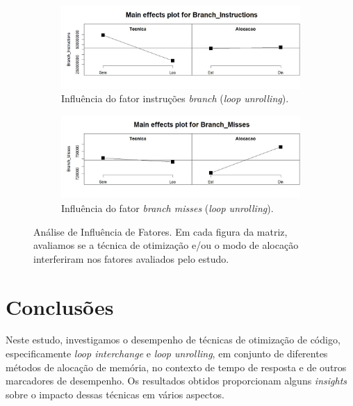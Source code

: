 \documentclass[12pt,a4paper]{article}
\begin{document}
\begin{figure}[H]
\begin{subfigure}{0.49\linewidth}
    \includegraphics[width=\linewidth]{Figures/fig_fatores_instrucoes_branch.jpg}
    \caption{Influência do fator instruções \textit{branch} (\textit{loop unrolling}).}
    \label{sub_fig:instrucoes_branch}
\end{subfigure}
\hfill
\begin{subfigure}{0.49\linewidth}
    \includegraphics[width=\linewidth]{Figures/fig_fatores_branch_misses.jpg}
    \caption{Influência do fator \textit{branch misses} (\textit{loop unrolling}).}
    \label{sub_fig:branch_misses}
\end{subfigure}

\caption{Análise de Influência de Fatores. Em cada figura da matriz, avaliamos se a técnica de otimização e/ou o modo de alocação interferiram nos fatores avaliados pelo estudo.}
\label{fig:influencia_fatores}
\end{figure}

\section{Conclusões} \label{sec:conclusoes}

Neste estudo, investigamos o desempenho de técnicas de otimização de código, especificamente \textit{loop interchange} e \textit{loop unrolling}, em conjunto de diferentes métodos de alocação de memória, no contexto de tempo de resposta e de outros marcadores de desempenho. Os resultados obtidos proporcionam alguns \textit{insights} sobre o impacto dessas técnicas em vários aspectos.
\end{document}
